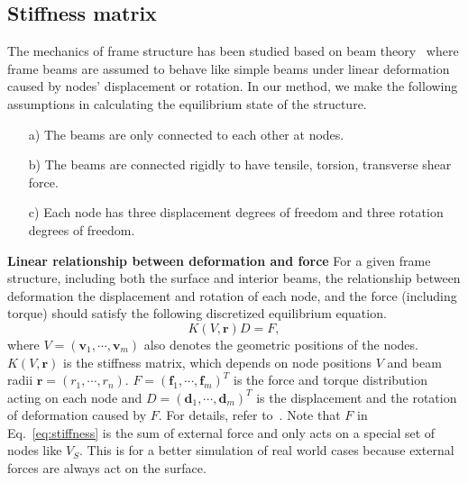 %
%


\subsection{Stiffness matrix}
\label{subsec:mechanics}


The mechanics of frame structure has been studied based on beam theory~\cite{Huges:1987,Gibson:1999,chandrupatla1991introduction} where frame beams are assumed to behave like simple beams under linear deformation caused by nodes' displacement or rotation. In our method, we make the following assumptions in calculating the equilibrium state of the structure.
\begin{itemize}
\item [a)] The beams are only connected to each other at nodes.
\item [b)] The beams are connected rigidly to have tensile, torsion, transverse shear force.
\item [c)] Each node has three displacement degrees of freedom and three rotation degrees of freedom.
\end{itemize}

\noindent\textbf{Linear relationship between deformation and force}
For a given frame structure, including both the surface and interior beams, the relationship between deformation \textemdash the displacement and rotation of each node, and the force (including torque) should satisfy the following discretized equilibrium equation.
\begin{equation} \label{eq:stiffness}
K(V,\mathbf{r}) D = F,
\end{equation}
where $V=(\mathbf{v}_1,\cdots,\mathbf{v}_m)$ also denotes the geometric positions of the nodes.
$K(V,\mathbf{r})$ is the stiffness matrix, which depends on node positions $V$ and beam radii $\mathbf{r}=(r_1,\cdots,r_n)$.
%
$F=(\mathbf{f}_1,\cdots,\mathbf{f}_m)^T$ is the force and torque distribution acting on each node and $D=(\mathbf{d}_1,\cdots,\mathbf{d}_m)^T$ is the displacement and the rotation of deformation caused by $F$.
For details, refer to~\cite{chandrupatla1991introduction}. Note that $F$ in Eq.~\eqref{eq:stiffness} is the sum of external force and only acts on a special set of nodes like $V_S$. This is for a better simulation of real world cases because external forces are always act on the surface.



